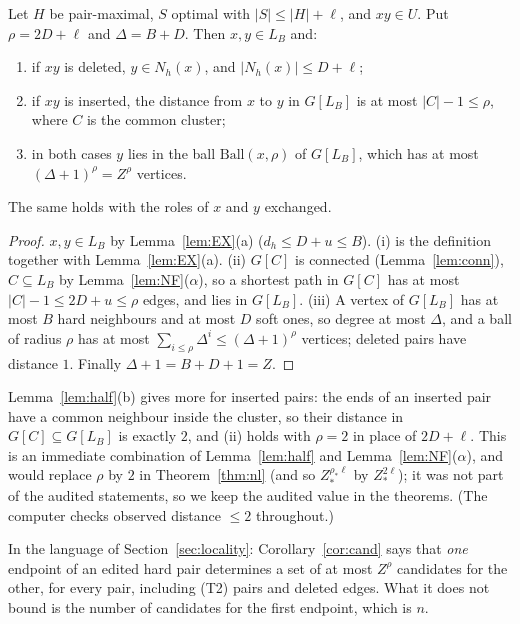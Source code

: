 \begin{corollary}\label{cor:cand}
Let $H$ be pair-maximal, $S$ optimal with $|S|\le|H|+\ell$, and $xy\in U$. Put $\rho=2D+\ell$ and $\Delta=B+D$. Then $x,y\in L_B$ and:
\begin{enumerate}
\item[(i)] if $xy$ is deleted, $y\in N_h(x)$, and $|N_h(x)|\le D+\ell$;
\item[(ii)] if $xy$ is inserted, the distance from $x$ to $y$ in $G[L_B]$ is at most $|C|-1\le\rho$, where $C$ is the common cluster;
\item[(iii)] in both cases $y$ lies in the ball $\mathrm{Ball}(x,\rho)$ of $G[L_B]$, which has at most $(\Delta+1)^{\rho}=Z^{\rho}$ vertices.
\end{enumerate}
The same holds with the roles of $x$ and $y$ exchanged.
\end{corollary}
\begin{proof}
$x,y\in L_B$ by Lemma~\ref{lem:EX}(a) ($d_h\le D+u\le B$). (i) is the definition together with Lemma~\ref{lem:EX}(a). (ii) $G[C]$ is connected (Lemma~\ref{lem:conn}), $C\subseteq L_B$ by Lemma~\ref{lem:NF}($\alpha$), so a shortest path in $G[C]$ has at most $|C|-1\le2D+u\le\rho$ edges, and lies in $G[L_B]$. (iii) A vertex of $G[L_B]$ has at most $B$ hard neighbours and at most $D$ soft ones, so degree at most $\Delta$, and a ball of radius $\rho$ has at most $\sum_{i\le\rho}\Delta^i\le(\Delta+1)^\rho$ vertices; deleted pairs have distance $1$. Finally $\Delta+1=B+D+1=Z$.
\end{proof}
\begin{remark}\label{rem:rad2}
Lemma~\ref{lem:half}(b) gives more for inserted pairs: the ends of an inserted pair have a common neighbour inside the cluster, so their distance in $G[C]\subseteq G[L_B]$ is exactly $2$, and (ii) holds with $\rho=2$ in place of $2D+\ell$. This is an immediate combination of Lemma~\ref{lem:half} and Lemma~\ref{lem:NF}($\alpha$), and would replace $\rho$ by $2$ in Theorem~\ref{thm:nl} (and so $Z_*^{\rho_*\ell}$ by $Z_*^{2\ell}$); it was not part of the audited statements, so we keep the audited value in the theorems. (The computer checks observed distance $\le2$ throughout.)
\end{remark}
In the language of Section~\ref{sec:locality}: Corollary~\ref{cor:cand} says that \emph{one} endpoint of an edited hard pair determines a set of at most $Z^{\rho}$ candidates for the other, for every pair, including (T2) pairs and deleted edges. What it does not bound is the number of candidates for the first endpoint, which is $n$.


